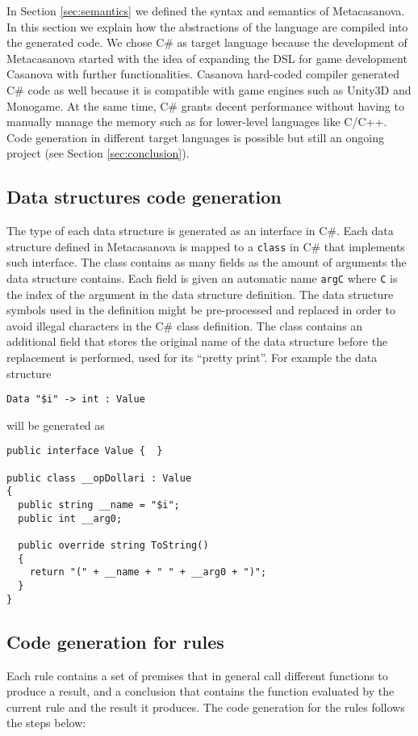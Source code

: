 In Section \ref{sec:semantics} we defined the syntax and semantics of Metacasanova. In this section we explain how the abstractions of the language are compiled into the generated code. We chose C\# as target language because the development of Metacasanova started with the idea of expanding the DSL for game development Casanova with further functionalities. Casanova hard-coded compiler generated C\# code as well because it is compatible with game engines such as Unity3D and Monogame. At the same time, C\# grants decent performance without having to manually manage the memory such as for lower-level languages like C/C++. Code generation in different target languages is possible but still an ongoing project (see Section \ref{sec:conclusion}).

\subsection{Data structures code generation}
The type of each data structure is generated as an interface in C\#. Each data structure defined in Metacasanova is mapped to a \texttt{class} in C\# that implements such interface. The class contains as many fields as the amount of arguments the data structure contains. Each field is given an automatic name \texttt{\tu\tu argC} where \texttt{C} is the index of the argument in the data structure definition. The data structure symbols used in the definition might be pre-processed and replaced in order to avoid illegal characters in the C\# class definition. The class contains an additional field that stores the original name of the data structure before the replacement is performed, used for its ``pretty print''. For example the data structure

\begin{lstlisting}
Data "$i" -> int : Value
\end{lstlisting}

\noindent
will be generated as

\begin{lstlisting}
public interface Value {  }

public class __opDollari : Value
{
  public string __name = "$i";
  public int __arg0;

  public override string ToString()
  {
    return "(" + __name + " " + __arg0 + ")";
  }
}
\end{lstlisting}

\subsection{Code generation for rules}
Each rule contains a set of premises that in general call different functions to produce a result, and a conclusion that contains the function evaluated by the current rule and the result it produces. The code generation for the rules follows the steps below:

